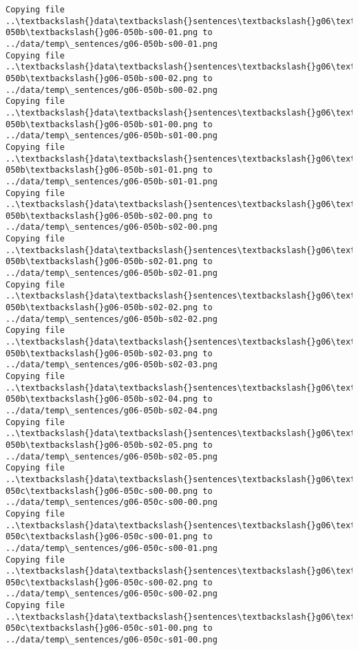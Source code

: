 \documentclass[11pt]{article}
\begin{document}
\begin{Verbatim}[commandchars=\\\{\}]
Copying file ..\textbackslash{}data\textbackslash{}sentences\textbackslash{}g06\textbackslash{}g06-050b\textbackslash{}g06-050b-s00-01.png to
../data/temp\_sentences/g06-050b-s00-01.png
Copying file ..\textbackslash{}data\textbackslash{}sentences\textbackslash{}g06\textbackslash{}g06-050b\textbackslash{}g06-050b-s00-02.png to
../data/temp\_sentences/g06-050b-s00-02.png
Copying file ..\textbackslash{}data\textbackslash{}sentences\textbackslash{}g06\textbackslash{}g06-050b\textbackslash{}g06-050b-s01-00.png to
../data/temp\_sentences/g06-050b-s01-00.png
Copying file ..\textbackslash{}data\textbackslash{}sentences\textbackslash{}g06\textbackslash{}g06-050b\textbackslash{}g06-050b-s01-01.png to
../data/temp\_sentences/g06-050b-s01-01.png
Copying file ..\textbackslash{}data\textbackslash{}sentences\textbackslash{}g06\textbackslash{}g06-050b\textbackslash{}g06-050b-s02-00.png to
../data/temp\_sentences/g06-050b-s02-00.png
Copying file ..\textbackslash{}data\textbackslash{}sentences\textbackslash{}g06\textbackslash{}g06-050b\textbackslash{}g06-050b-s02-01.png to
../data/temp\_sentences/g06-050b-s02-01.png
Copying file ..\textbackslash{}data\textbackslash{}sentences\textbackslash{}g06\textbackslash{}g06-050b\textbackslash{}g06-050b-s02-02.png to
../data/temp\_sentences/g06-050b-s02-02.png
Copying file ..\textbackslash{}data\textbackslash{}sentences\textbackslash{}g06\textbackslash{}g06-050b\textbackslash{}g06-050b-s02-03.png to
../data/temp\_sentences/g06-050b-s02-03.png
Copying file ..\textbackslash{}data\textbackslash{}sentences\textbackslash{}g06\textbackslash{}g06-050b\textbackslash{}g06-050b-s02-04.png to
../data/temp\_sentences/g06-050b-s02-04.png
Copying file ..\textbackslash{}data\textbackslash{}sentences\textbackslash{}g06\textbackslash{}g06-050b\textbackslash{}g06-050b-s02-05.png to
../data/temp\_sentences/g06-050b-s02-05.png
Copying file ..\textbackslash{}data\textbackslash{}sentences\textbackslash{}g06\textbackslash{}g06-050c\textbackslash{}g06-050c-s00-00.png to
../data/temp\_sentences/g06-050c-s00-00.png
Copying file ..\textbackslash{}data\textbackslash{}sentences\textbackslash{}g06\textbackslash{}g06-050c\textbackslash{}g06-050c-s00-01.png to
../data/temp\_sentences/g06-050c-s00-01.png
Copying file ..\textbackslash{}data\textbackslash{}sentences\textbackslash{}g06\textbackslash{}g06-050c\textbackslash{}g06-050c-s00-02.png to
../data/temp\_sentences/g06-050c-s00-02.png
Copying file ..\textbackslash{}data\textbackslash{}sentences\textbackslash{}g06\textbackslash{}g06-050c\textbackslash{}g06-050c-s01-00.png to
../data/temp\_sentences/g06-050c-s01-00.png

\end{Verbatim}
\end{document}
